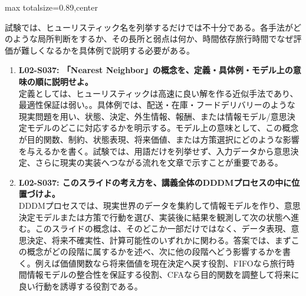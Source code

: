 \begin{minipage}[t]{0.58\textwidth}
\begin{adjustbox}{max totalsize={\textwidth}{0.89\textheight},center}
\begin{minipage}{\textwidth}
試験では、ヒューリスティック名を列挙するだけでは不十分である。各手法がどのような局所判断をするか、その長所と弱点は何か、時間依存旅行時間でなぜ評価が難しくなるかを具体例で説明する必要がある。\par{}\begin{enumerate}\item \textbf{L02-S037: 「Nearest Neighbor」の概念を、定義・具体例・モデル上の意味の順に説明せよ。}\\定義としては、ヒューリスティックは高速に良い解を作る近似手法であり、最適性保証は弱い。。具体例では、配送・在庫・フードデリバリーのような現実問題を用い、状態、決定、外生情報、報酬、または情報モデル/意思決定モデルのどこに対応するかを明示する。モデル上の意味として、この概念が目的関数、制約、状態表現、将来価値、または方策選択にどのような影響を与えるかを書く。試験では、用語だけを列挙せず、入力データから意思決定、さらに現実の実装へつながる流れを文章で示すことが重要である。\item \textbf{L02-S037: このスライドの考え方を、講義全体のDDDMプロセスの中に位置づけよ。}\\DDDMプロセスでは、現実世界のデータを集約して情報モデルを作り、意思決定モデルまたは方策で行動を選び、実装後に結果を観測して次の状態へ進む。このスライドの概念は、そのどこか一部だけではなく、データ表現、意思決定、将来不確実性、計算可能性のいずれかに関わる。答案では、まずこの概念がどの段階に属するかを述べ、次に他の段階へどう影響するかを書く。例えば価値関数なら将来価値を現在決定へ戻す役割、FIFOなら旅行時間情報モデルの整合性を保証する役割、CFAなら目的関数を調整して将来に良い行動を誘導する役割である。\end{enumerate}
\end{minipage}
\end{adjustbox}
\end{minipage}


